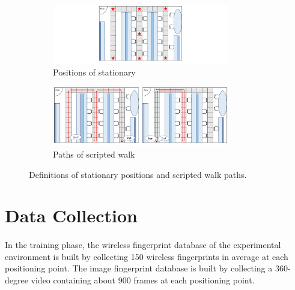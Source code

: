 \documentclass[a4paper,12pt]{report}
\begin{document}
\begin{figure}[tbph]%
    \begin{subfigure}{1\linewidth}
    \centering
        \includegraphics[width=0.85\textwidth]{images/4_3_Experimental_Scenarios_ST.png}
        \caption{Positions of stationary}
        \label{figure:4_3_Experimental_Scenarios_ST}
    \end{subfigure}
    \begin{subfigure}{1\linewidth}
    \centering
        \includegraphics[width=0.85\textwidth]{images/4_3_Experimental_Scenarios_SW.png}
        \caption{Paths of scripted walk}
        \label{figure:4_3_Experimental_Scenarios_SW}
    \end{subfigure}
\caption{Definitions of stationary positions and scripted walk paths.}
\label{figure:4_3_Experimental_Scenarios}
\end{figure}

\section{Data Collection}
\paragraph{}
In the training phase, the wireless fingerprint database of the experimental environment is built by collecting 150 wireless fingerprints in average at each positioning point. The image fingerprint database is built by collecting a 360-degree video containing about 900 frames at each positioning point.
\end{document}
